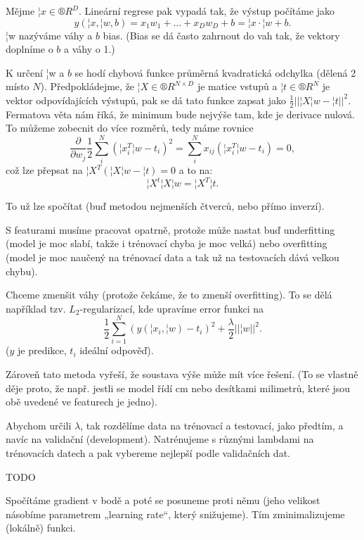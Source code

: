 \documentclass[12pt]{article}					%
\begin{document}
\begin{definice}
	Mějme $¦x \in ®R^D$. Lineární regrese pak vypadá tak, že výstup počítáme jako
	$$ y\left(¦x, ¦w, b\right) = x_1w_1 + … + x_Dw_D + b = ¦x·¦w + b. $$
	¦w nazýváme váhy a $b$ bias. (Bias se dá často zahrnout do vah tak, že vektory doplníme o $b$ a váhy o 1.)

	K určení ¦w a $b$ se hodí chybová funkce průměrná kvadratická odchylka (dělená 2 místo $N$). Předpokládejme, že $¦X \in ®R^{N\times D}$ je matice vstupů a $¦t \in ®R^N$ je vektor odpovídajících výstupů, pak se dá tato funkce zapsat jako $\frac{1}{2}||¦X¦w - ¦t||^2$. Fermatova věta nám říká, že minimum bude nejvýše tam, kde je derivace nulová. To můžeme zobecnit do více rozměrů, tedy máme rovnice
	$$ \frac{\partial}{\partial w_j}\frac{1}{2} \sum_i^N\left(¦x_i^T¦w - t_i\right)^2 = \sum_i^N x_{ij}\left(¦x_i^T¦w - t_i\right) = 0, $$
	což lze přepsat na $¦X^T\left(¦X¦w - ¦t\right) = 0 $ a to na:
	$$ ¦X^t¦X¦w = ¦X^T¦t. $$
	
	To už lze spočítat (buď metodou nejmenších čtverců, nebo přímo inverzí).
\end{definice}

\begin{poznamka}
	S featurami musíme pracovat opatrně, protože může nastat buď underfitting (model je moc slabí, takže i trénovací chyba je moc velká) nebo overfitting (model je moc naučený na trénovací data a tak už na testovacích dává velkou chybu).
\end{poznamka}


\begin{definice}[Regularizace]
	Chceme zmenšit váhy (protože čekáme, že to zmenší overfitting). To se dělá například tzv. $L_2$-regularizací, kde upravíme error funkci na
	$$ \frac{1}{2}\sum_{i=1}^N (y(¦x_i, ¦w) - t_i)^2 + \frac{\lambda}{2}||¦w||^2. $$
	($y$ je predikce, $t_i$ ideální odpověď).

	Zároveň tato metoda vyřeší, že soustava výše může mít více řešení. (To se vlastně děje proto, že např. jestli se model řídí cm nebo desítkami milimetrů, které jsou obě uvedené ve featurech je jedno).
\end{definice}

\begin{poznamka}
	Abychom určili $\lambda$, tak rozdělíme data na trénovací a testovací, jako předtím, a navíc na validační (development). Natrénujeme s různými lambdami na trénovacích datech a pak vybereme nejlepší podle validačních dat.
\end{poznamka}

TODO

\begin{definice}
	Spočítáme gradient v bodě a poté se posuneme proti němu (jeho velikost násobíme parametrem „learning rate“, který snižujeme). Tím zminimalizujeme (lokálně) funkci.
\end{definice}
\end{document}
